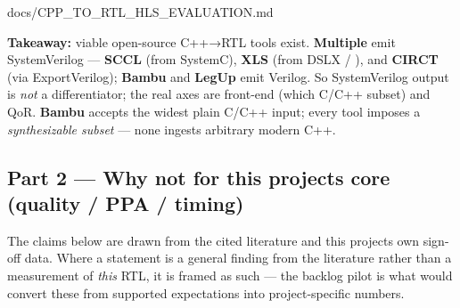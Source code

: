 \begin{relocated}{docs/CPP_TO_RTL_HLS_EVALUATION.md}
{}

\textbf{Takeaway:} viable open-source C++→RTL tools exist.
\textbf{Multiple} emit SystemVerilog --- \textbf{SCCL} (from SystemC),
\textbf{XLS} (from DSLX / ), and \textbf{CIRCT} (via
ExportVerilog); \textbf{Bambu} and \textbf{LegUp} emit Verilog. So
SystemVerilog output is \emph{not} a differentiator; the real axes are
front-end (which C/C++ subset) and QoR. \textbf{Bambu} accepts the
widest plain C/C++ input; every tool imposes a \emph{synthesizable
subset} --- none ingests arbitrary modern C++.

\subsection{Part 2 --- Why not for this project\textquotesingle s core
(quality / PPA / timing)}\label{tm:dec:cpp-to-rtl-hls-evaluation:part-2-why-not-for-this-projects-core-quality-ppa-timing}

The claims below are drawn from the cited literature and this
project\textquotesingle s own sign-off data. Where a statement is a
general finding from the literature rather than a measurement of
\emph{this} RTL, it is framed as such --- the backlog pilot is what
would convert these from supported expectations into project-specific
numbers.


\end{relocated}
